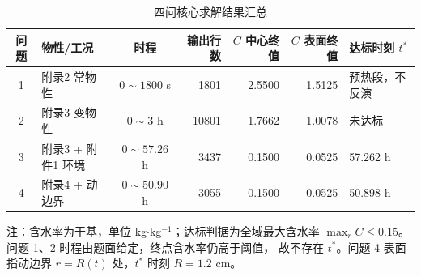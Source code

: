 \begin{table}[H]
  \centering
  \caption{四问核心求解结果汇总}
  \label{tab:main_results}
  \small
  \begin{tabular}{clcrrrl}
    \toprule
    问题 & 物性/工况 & 时程 & 输出行数 & $C$ 中心终值 & $C$ 表面终值 & 达标时刻 $t^*$ \\
    \midrule
    1 & 附录2 常物性       & $0\sim1800$ s   & 1801  & 2.5500 & 1.5125 & 预热段，不反演 \\
    2 & 附录3 变物性       & $0\sim3$ h      & 10801 & 1.7662 & 1.0078 & 未达标 \\
    3 & 附录3 + 附件1 环境 & $0\sim57.26$ h  & 3437  & 0.1500 & 0.0525 & 57.262 h \\
    4 & 附录4 + 动边界     & $0\sim50.90$ h  & 3055  & 0.1500 & 0.0525 & 50.898 h \\
    \bottomrule
  \end{tabular}

  \vspace{2pt}
  \parbox{0.92\linewidth}{\footnotesize
  注：含水率为干基，单位 kg$\cdot$kg$^{-1}$；达标判据为全域最大含水率
  $\max_r C\le 0.15$。问题 1、2 时程由题面给定，终点含水率仍高于阈值，
  故不存在 $t^*$。问题 4 表面指动边界 $r=R(t)$ 处，$t^*$ 时刻 $R=1.2$ cm。}
\end{table}
